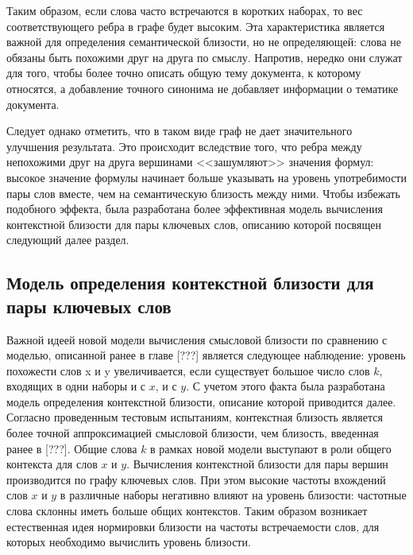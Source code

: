 Таким образом, если слова часто встречаются в  коротких наборах, то вес соответствующего ребра в графе будет высоким. Эта характеристика является важной для определения семантической близости, но не определяющей: слова не обязаны быть похожими друг на друга по смыслу. Напротив, нередко они служат для того, чтобы более точно описать общую тему документа, к которому относятся, а добавление точного синонима не добавляет информации о тематике документа. 

Следует однако отметить, что в таком виде граф не дает значительного улучшения результата. Это происходит вследствие того, что ребра между непохожими друг на друга вершинами <<зашумляют>> значения формул:   высокое значение формулы начинает больше указывать на уровень употребимости пары слов вместе, чем на семантическую близость между ними. Чтобы избежать подобного эффекта, была разработана более эффективная модель вычисления контекстной близости для пары ключевых слов, описанию которой посвящен следующий далее раздел.


\subsection{Модель определения контекстной близости для пары ключевых слов} \label{cont_sim}
Важной идеей новой модели вычисления смысловой близости по сравнению с моделью, описанной ранее в главе [???] является следующее наблюдение: уровень похожести слов x и y увеличивается, если существует большое число слов $k$, входящих в одни наборы и с $x$, и с $y$. С учетом этого факта была разработана модель определения контекстной близости, описание которой приводится далее. Согласно проведенным тестовым испытаниям, контекстная близость является более точной аппроксимацией смысловой близости, чем близость, введенная ранее в [???]. Общие слова $k$ в рамках новой модели выступают в роли общего контекста для слов $x$ и $y$. Вычисления контекстной близости для пары вершин производится по графу ключевых слов. При этом высокие частоты вхождений слов $x$ и $y$ в различные наборы негативно влияют на уровень близости: частотные слова склонны иметь больше общих контекстов. Таким образом возникает естественная идея нормировки близости на частоты встречаемости слов, для которых необходимо вычислить уровень близости. 

